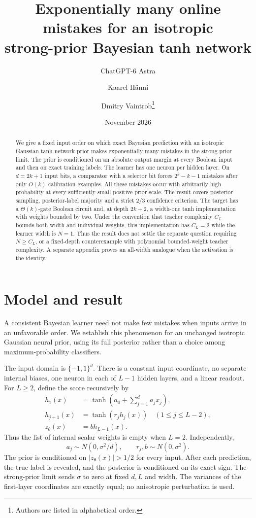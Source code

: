 \documentclass[11pt]{article}
\title{Exponentially many online mistakes for an isotropic\protect\\ strong-prior Bayesian tanh network}
\author{ChatGPT-6 Astra \and Kaarel H\"anni \and Dmitry Vaintrob\thanks{Authors are listed in alphabetical order.}}
\date{November 2026}
\theoremstyle{remark}\newtheorem{remark}[theorem]{Remark}
\begin{document}
\maketitle
\begin{abstract}
We give a fixed input order on which exact Bayesian prediction with an
isotropic Gaussian tanh-network prior makes exponentially many mistakes
in the strong-prior limit. The prior is conditioned on an absolute output
margin at every Boolean input and then on exact training labels. The learner
has one neuron per hidden layer. On $d=2k+1$ input bits, a comparator with a
selector bit forces $2^k-k-1$ mistakes after only $O(k)$ calibration examples.
All these mistakes occur with arbitrarily high probability at every
sufficiently small positive prior scale.
The result covers posterior sampling, posterior-label majority and a
strict $2/3$ confidence criterion. The target has a $\Theta(k)$-gate Boolean
circuit and, at depth $2k+2$, a width-one tanh implementation with weights
bounded by two. Under the convention that teacher complexity $C_L$ bounds
both width and individual weights, this implementation has $C_L=2$ while
the learner width is $N=1$. Thus the result does not settle the separate
question requiring $N\ge C_L$, or a fixed-depth counterexample with
polynomial bounded-weight teacher complexity. A separate appendix proves
an all-width analogue when the activation is the identity.
\end{abstract}

\section{Model and result}

A consistent Bayesian learner need not make few mistakes when inputs arrive
in an unfavorable order. We establish this phenomenon for an unchanged
isotropic Gaussian neural prior, using its full posterior rather than a
choice among maximum-probability classifiers.

The input domain is $\{-1,1\}^d$. There is a constant input coordinate,
no separate internal biases, one neuron in each of $L-1$ hidden layers,
and a linear readout. For $L\ge2$, define the score recursively by
\[
 \begin{aligned}
 h_1(x)&=\tanh\!\left(a_0+\sum_{j=1}^d a_jx_j\right),\\
 h_{j+1}(x)&=\tanh(r_jh_j(x))\quad(1\le j\le L-2),\\
 z_\theta(x)&=b h_{L-1}(x).
\end{aligned}
\]
Thus the list of internal scalar weights is empty when $L=2$.
Independently,
\[
 a_j\sim N(0,\sigma^2/d),\qquad r_j,b\sim N(0,\sigma^2).
\]
The prior is conditioned on $|z_\theta(x)|>1/2$ for every input.
After each prediction, the true label is revealed, and the posterior is
conditioned on its exact sign. The strong-prior limit sends $\sigma$ to zero
at fixed $d,L$ and width. The variances of the first-layer coordinates are
exactly equal; no anisotropic perturbation is used.
\end{document}
